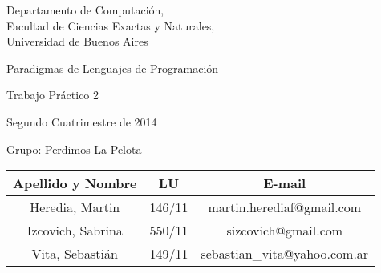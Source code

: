 \documentclass[10pt, a4paper]{article}
\author{Paradigmas de Lenguajes de Programación, DC, UBA.}
\date{}
\begin{document}
	
\thispagestyle{caratula}

\begin{center}

\vspace{2cm}

Departamento de Computación,\\
Facultad de Ciencias Exactas y Naturales,\\
Universidad de Buenos Aires

\vspace{4cm}

\begin{Huge}
Paradigmas de Lenguajes de Programación
\end{Huge}

\vspace{0.5cm}

\begin{huge}
Trabajo Práctico 2
\end{huge}

\vspace{1cm}

Segundo Cuatrimestre de 2014

\vspace{4cm}


\begin{Large}
Grupo: Perdimos La Pelota
\end{Large}

\vspace{1cm}

\begin{tabular}{|c|c|c|}
\hline
Apellido y Nombre & LU & E-mail\\
\hline
Heredia, Martin        & 146/11 & martin.herediaf@gmail.com\\
Izcovich, Sabrina      & 550/11 & sizcovich@gmail.com\\
Vita, Sebastián        & 149/11 & sebastian\_vita@yahoo.com.ar\\
\hline
\end{tabular}

\end{center}

\newpage
\end{document}
